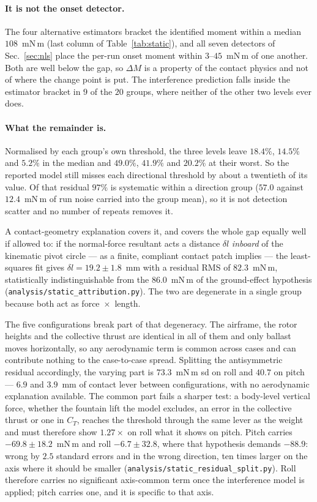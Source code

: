 \documentclass[10pt]{article}
\begin{document}
\paragraph{It is not the onset detector.}
The four alternative estimators bracket the identified moment within a
median $108$~mN\,m (last column of Table~\ref{tab:static}), and all
seven detectors of Sec.~\ref{sec:nls} place the per-run onset moment
within $3$--$45$~mN\,m of one another. Both are well below the gap, so
$\Delta M$ is a property of the contact physics and not of where the
change point is put. The interference prediction falls inside the
estimator bracket in $9$ of the $20$ groups, where neither of the
other two levels ever does.

\paragraph{What the remainder is.}
Normalised by each group's own threshold, the three levels leave
$18.4\%$, $14.5\%$ and $5.2\%$ in the median and $49.0\%$, $41.9\%$
and $20.2\%$ at their worst. So the reported model still misses each
directional threshold by about a twentieth of its value. Of that
residual $97\%$ is systematic within a direction group ($57.0$ against
$12.4$~mN\,m of run noise carried into the group mean), so it is not
detection scatter and no number of repeats removes it.

A contact-geometry explanation covers it, and covers the whole gap
equally well if allowed to: if the normal-force resultant acts a
distance $\delta l$ \emph{inboard} of the kinematic pivot circle --- as
a finite, compliant contact patch implies --- the least-squares fit
gives $\delta l = 19.2 \pm 1.8$~mm with a residual RMS of
$82.3$~mN\,m, statistically indistinguishable from the $86.0$~mN\,m of
the ground-effect hypothesis
(\texttt{analysis/static\_attribution.py}). The two are degenerate in
a single group because both act as force~$\times$~length.

The five configurations break part of that degeneracy. The airframe,
the rotor heights and the collective thrust are identical in all of
them and only ballast moves horizontally, so any aerodynamic term is
common across cases and can contribute nothing to the case-to-case
spread. Splitting the antisymmetric residual accordingly, the varying
part is $73.3$~mN\,m sd on roll and $40.7$ on pitch --- $6.9$ and
$3.9$~mm of contact lever between configurations, with no aerodynamic
explanation available. The common part fails a sharper test: a
body-level vertical force, whether the fountain lift the model
excludes, an error in the collective thrust or one in $C_T$, reaches
the threshold through the same lever as the weight and must therefore
show $1.27\times$ on roll what it shows on pitch. Pitch carries
$-69.8 \pm 18.2$~mN\,m and roll $-6.7 \pm 32.8$, where that hypothesis
demands $-88.9$: wrong by $2.5$ standard errors and in the wrong
direction, ten times larger on the axis where it should be smaller
(\texttt{analysis/static\_residual\_split.py}). Roll therefore
carries no significant axis-common term once the interference model is
applied; pitch carries one, and it is specific to that axis.
\end{document}
